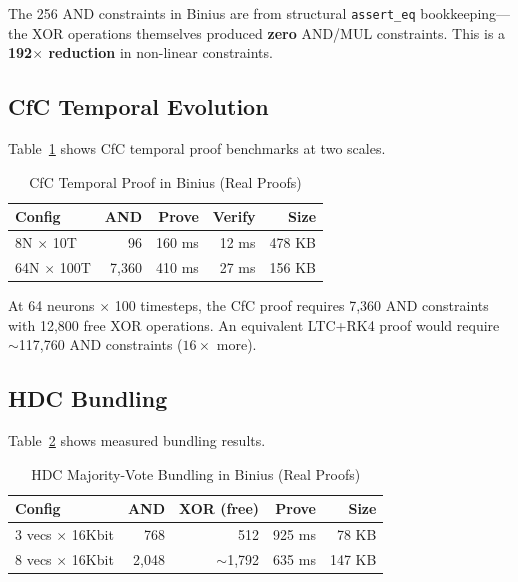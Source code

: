 \documentclass[11pt,twocolumn]{article}
\begin{document}
The 256 AND constraints in Binius are from structural \texttt{assert\_eq} bookkeeping---the XOR operations themselves produced \textbf{zero} AND/MUL constraints. This is a \textbf{192$\times$ reduction} in non-linear constraints.

\subsection{CfC Temporal Evolution}

Table~\ref{tab:cfc_results} shows CfC temporal proof benchmarks at two scales.

\begin{table}[t]
\centering
\caption{CfC Temporal Proof in Binius (Real Proofs)}
\label{tab:cfc_results}
\begin{tabular}{@{}lrrrr@{}}
\toprule
\textbf{Config} & \textbf{AND} & \textbf{Prove} & \textbf{Verify} & \textbf{Size} \\
\midrule
8N $\times$ 10T & 96 & 160 ms & 12 ms & 478 KB \\
64N $\times$ 100T & 7,360 & 410 ms & 27 ms & 156 KB \\
\bottomrule
\end{tabular}
\end{table}

At 64 neurons $\times$ 100 timesteps, the CfC proof requires 7,360 AND constraints with 12,800 free XOR operations. An equivalent LTC+RK4 proof would require $\sim$117,760 AND constraints ($16\times$ more).

\subsection{HDC Bundling}

Table~\ref{tab:bundling} shows measured bundling results.

\begin{table}[t]
\centering
\caption{HDC Majority-Vote Bundling in Binius (Real Proofs)}
\label{tab:bundling}
\begin{tabular}{@{}lrrrr@{}}
\toprule
\textbf{Config} & \textbf{AND} & \textbf{XOR (free)} & \textbf{Prove} & \textbf{Size} \\
\midrule
3 vecs $\times$ 16Kbit & 768 & 512 & 925 ms & 78 KB \\
8 vecs $\times$ 16Kbit & 2,048 & $\sim$1,792 & 635 ms & 147 KB \\
\bottomrule
\end{tabular}
\end{table}
\end{document}
